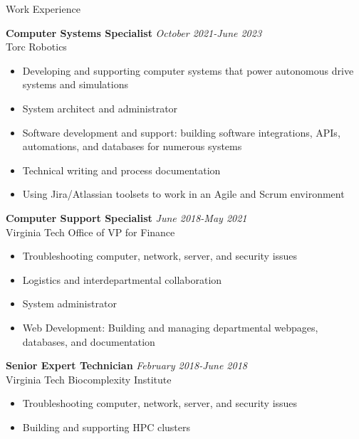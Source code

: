 \documentclass{resume} %
\begin{document}
\begin{rSection}{Work Experience}

\textbf{Computer Systems Specialist} \hfill \textit{October 2021-June 2023} \\
Torc Robotics
 \begin{itemize}
    \itemsep -3pt {} 
     \item Developing and supporting computer systems that power autonomous drive systems and simulations
     \item System architect and administrator
     \item Software development and support: building software integrations, APIs, automations, and databases for numerous systems
     \item Technical writing and process documentation
     \item Using Jira/Atlassian toolsets to work in an Agile and Scrum environment
 \end{itemize}
 
\textbf{Computer Support Specialist} \hfill \textit{June 2018-May 2021} \\
Virginia Tech Office of VP for Finance
 \begin{itemize}
    \itemsep -3pt {} 
     \item Troubleshooting computer, network, server, and security issues
     \item Logistics and interdepartmental collaboration
     \item System administrator
     \item Web Development: Building and managing departmental webpages, databases, and documentation
 \end{itemize}

\vspace{10pt}

 \textbf{Senior Expert Technician} \hfill \textit{February 2018-June 2018} \\
 Virginia Tech Biocomplexity Institute
  \begin{itemize}
     \itemsep -3pt {} 
      \item Troubleshooting computer, network, server, and security issues
      \item Building and supporting HPC clusters
  \end{itemize}


\end{rSection}
\end{document}
